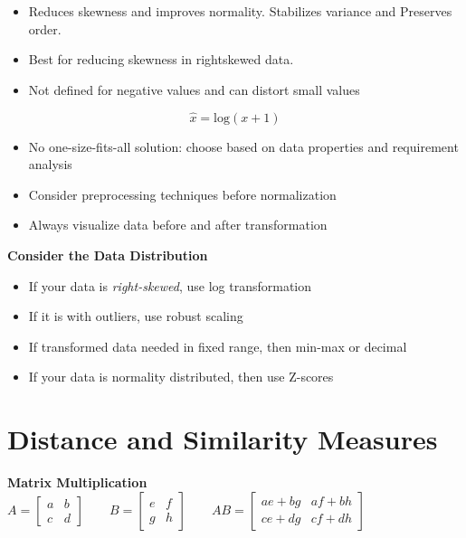 \documentclass{article}
\begin{document}
\begin{itemize}
    \item Reduces skewness and improves normality. Stabilizes variance and Preserves order.
    \item Best for reducing skewness in rightskewed data.
    \item Not defined for negative values and can distort small values
\end{itemize}
\[
\hat{x} = \text{log}(x + 1)
\]

\begin{itemize}
    \item No one-size-fits-all solution: choose based on data properties and requirement analysis
    \item Consider preprocessing techniques before normalization
    \item Always visualize data before and after transformation
\end{itemize}

\textbf{Consider the Data Distribution}
\begin{itemize}
    \item If your data is \textit{right-skewed}, use log transformation
    \item If it is with outliers, use robust scaling
    \item If transformed data needed in fixed range, then min-max or decimal
    \item If your data is normality distributed, then use Z-scores
\end{itemize}

\newpage
\section{Distance and Similarity Measures}
\textbf{Matrix Multiplication }
$A = \begin{bmatrix}
a & b \\
c & d
\end{bmatrix}
\qquad
B = \begin{bmatrix}
e & f \\
g & h
\end{bmatrix}
\qquad
AB = \begin{bmatrix}
ae + bg & af + bh \\
ce + dg & cf + dh
\end{bmatrix}
$

\end{document}

